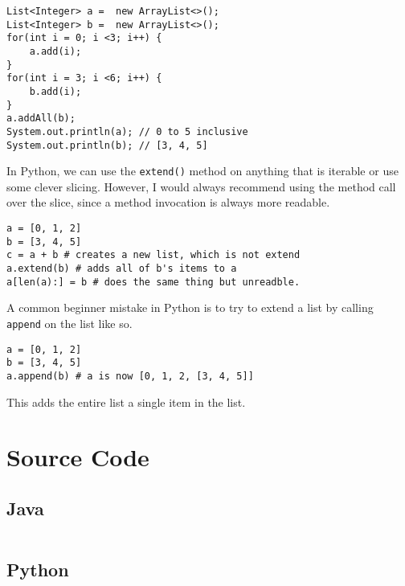 \begin{verbatim}
List<Integer> a =  new ArrayList<>();
List<Integer> b =  new ArrayList<>();
for(int i = 0; i <3; i++) { 
	a.add(i); 
}
for(int i = 3; i <6; i++) { 
	b.add(i); 
}
a.addAll(b);
System.out.println(a); // 0 to 5 inclusive
System.out.println(b); // [3, 4, 5]
\end{verbatim}

In Python, we can use the \texttt{extend()} method on anything that is iterable or use some clever slicing.  However, I would always recommend using the method call over the slice, since a method invocation is always more readable.


\begin{verbatim}
a = [0, 1, 2]
b = [3, 4, 5]
c = a + b # creates a new list, which is not extend
a.extend(b) # adds all of b's items to a
a[len(a):] = b # does the same thing but unreadble.
\end{verbatim}
A common beginner mistake in Python is to try to extend a list by calling \texttt{append} on the list like so.

\begin{verbatim}
a = [0, 1, 2]
b = [3, 4, 5]
a.append(b) # a is now [0, 1, 2, [3, 4, 5]]
\end{verbatim}



This adds the entire list a single item in the list.  

\newpage
\section{Source Code}
\subsection{Java}
\inputminted{Java}{code/MyArrayList.java}
\newpage
\subsection{Python}
\inputminted{Python3}{code/arraylist.py}
